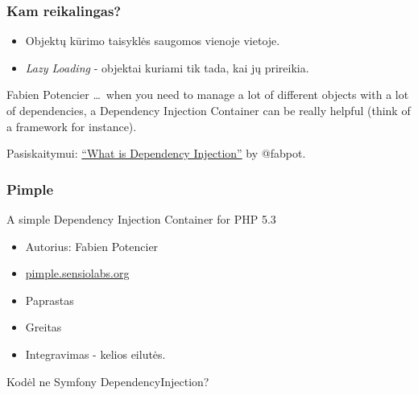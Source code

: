 \documentclass[12pt,a4paper]{beamer}
\begin{document}
\begin{frame}
    \frametitle{Kam reikalingas?}

    \begin{itemize}
        \item Objektų kūrimo taisyklės saugomos vienoje vietoje.
        \item \textit{Lazy Loading} - objektai kuriami tik tada, kai jų prireikia.
    \end{itemize}

    \begin{block}{Fabien Potencier}
        \dots\ when you need to manage a lot of different objects with a lot of dependencies, a Dependency Injection Container can be really helpful (think of a framework for instance).
    \end{block}

    Pasiskaitymui: \href{http://fabien.potencier.org/article/11/what-is-dependency-injection}{``What is Dependency Injection''} by @fabpot.
    
\end{frame}
\begin{frame}
    \frametitle{Pimple}
    A simple Dependency Injection Container for PHP 5.3
    \begin{itemize}
        \item Autorius: Fabien Potencier
        \item \url{pimple.sensiolabs.org}
        \item Paprastas
        \item Greitas
        \item Integravimas - kelios eilutės.
    \end{itemize}
    \pause
    \vskip15pt
    {\color{red}Kodėl ne Symfony DependencyInjection?}
\end{frame}
\end{document}
